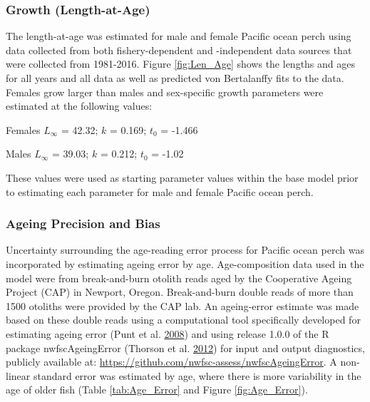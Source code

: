 \documentclass[12pt,]{article}
\begin{document}
\subsubsection{Growth (Length-at-Age)}\label{growth-length-at-age}

The length-at-age was estimated for male and female Pacific ocean perch
using data collected from both fishery-dependent and -independent data
sources that were collected from 1981-2016. Figure \ref{fig:Len_Age}
shows the lengths and ages for all years and all data as well as
predicted von Bertalanffy fits to the data. Females grow larger than
males and sex-specific growth parameters were estimated at the following
values:

\begin{centering}

Females $L_{\infty}$ = 42.32; $k$ = 0.169; $t_0$ = -1.466

Males $L_{\infty}$ = 39.03; $k$ = 0.212; $t_0$ = -1.02

\end{centering}

These values were used as starting parameter values within the base
model prior to estimating each parameter for male and female Pacific
ocean perch.

\subsubsection{Ageing Precision and
Bias}\label{ageing-precision-and-bias}

Uncertainty surrounding the age-reading error process for Pacific ocean
perch was incorporated by estimating ageing error by age.
Age-composition data used in the model were from break-and-burn otolith
reads aged by the Cooperative Ageing Project (CAP) in Newport, Oregon.
Break-and-burn double reads of more than 1500 otoliths were provided by
the CAP lab. An ageing-error estimate was made based on these double
reads using a computational tool specifically developed for estimating
ageing error (Punt et al.
\protect\hyperlink{ref-punt_quantifying_2008}{2008}) and using release
1.0.0 of the R package nwfscAgeingError (Thorson et al.
\protect\hyperlink{ref-thorson_nwfscageingerror:_2012}{2012}) for input
and output diagnostics, publicly available at:
\url{https://github.com/nwfsc-assess/nwfscAgeingError}. A non-linear
standard error was estimated by age, where there is more variability in
the age of older fish (Table \ref{tab:Age_Error} and Figure
\ref{fig:Age_Error}).
\end{document}
